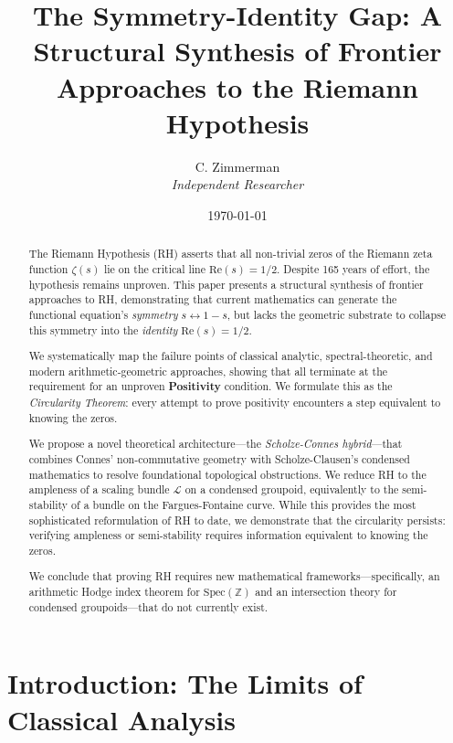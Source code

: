 \documentclass[12pt, a4paper]{article}
\title{\textbf{The Symmetry-Identity Gap: A Structural Synthesis of Frontier Approaches to the Riemann Hypothesis}}
\author{
C. Zimmerman\\
\textit{Independent Researcher}
}
\date{\today}
\theoremstyle{definition}
\newcommand{\Z}{\mathbb{Z}}
\newcommand{\Spec}{\mathrm{Spec}}
\newcommand{\re}{\mathrm{Re}}
\begin{document}
\maketitle

\begin{abstract}
The Riemann Hypothesis (RH) asserts that all non-trivial zeros of the Riemann zeta function $\zeta(s)$ lie on the critical line $\re(s) = 1/2$. Despite 165 years of effort, the hypothesis remains unproven. This paper presents a structural synthesis of frontier approaches to RH, demonstrating that current mathematics can generate the functional equation's \textit{symmetry} $s \leftrightarrow 1-s$, but lacks the geometric substrate to collapse this symmetry into the \textit{identity} $\re(s) = 1/2$.

We systematically map the failure points of classical analytic, spectral-theoretic, and modern arithmetic-geometric approaches, showing that all terminate at the requirement for an unproven \textbf{Positivity} condition. We formulate this as the \textit{Circularity Theorem}: every attempt to prove positivity encounters a step equivalent to knowing the zeros.

We propose a novel theoretical architecture---the \textit{Scholze-Connes hybrid}---that combines Connes' non-commutative geometry with Scholze-Clausen's condensed mathematics to resolve foundational topological obstructions. We reduce RH to the ampleness of a scaling bundle $\mathcal{L}$ on a condensed groupoid, equivalently to the semi-stability of a bundle on the Fargues-Fontaine curve. While this provides the most sophisticated reformulation of RH to date, we demonstrate that the circularity persists: verifying ampleness or semi-stability requires information equivalent to knowing the zeros.

We conclude that proving RH requires new mathematical frameworks---specifically, an arithmetic Hodge index theorem for $\Spec(\Z)$ and an intersection theory for condensed groupoids---that do not currently exist.
\end{abstract}

\tableofcontents
\newpage

\section{Introduction: The Limits of Classical Analysis}
\end{document}
